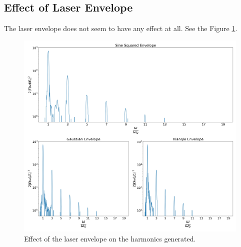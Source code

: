 \documentclass[12pt]{article}
\newenvironment{changemargin}[2]{%
\begin{list}{}{%
\setlength{\topsep}{0pt}%
\setlength{\leftmargin}{#1}%
\setlength{\rightmargin}{#2}%
\setlength{\listparindent}{\parindent}%
\setlength{\itemindent}{\parindent}%
\setlength{\parsep}{\parskip}%
}%
\item[]}{\end{list}}
\begin{document}
\begin{changemargin}{-2cm}{-2cm}
    \subsection{Effect of Laser Envelope}
    The laser envelope does not seem to have any effect at all. See the Figure \ref{fig:env}.
    \begin{figure}[t]
        \centering
        \includegraphics[width=1.0\textwidth, height=0.8\textwidth]{images/env.jpg}
        \caption{Effect of the laser envelope on the harmonics generated.}
        \label{fig:env}
    \end{figure}


\end{changemargin}
\end{document}

